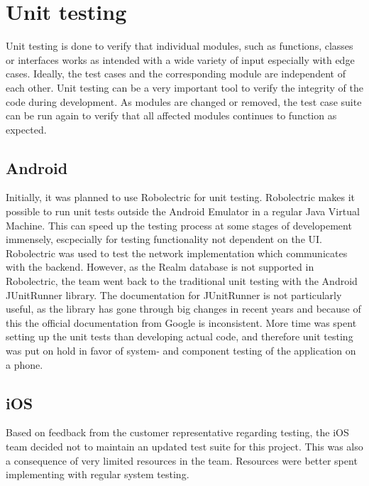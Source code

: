 \section{Unit testing}
Unit testing is done to verify that individual modules, such as functions, classes or interfaces works as intended with a wide variety of input \textendash  especially with edge cases. \cite[p. 211-216]{progark} Ideally, the test cases and the corresponding module are independent of each other. Unit testing can be a very important tool to verify the integrity of the code during development. As modules are changed or removed, the test case suite can be run again to verify that all affected modules continues to function as expected.
\subsection{Android}
Initially, it was planned to use Robolectric for unit testing. Robolectric makes it possible to run unit tests outside the Android Emulator in a regular Java Virtual Machine. \cite{robolectric} This can speed up the testing process at some stages of developement immensely, escpecially for testing functionality not dependent on the UI. Robolectric was used to test the network implementation which communicates with the \gls{backend}. However, as the Realm database is not supported in Robolectric, the team went back to the traditional unit testing with the Android JUnitRunner library. The documentation for JUnitRunner is not particularly useful, as the library has gone through big changes in recent years and because of this the official documentation from Google is inconsistent. More time was spent setting up the unit tests than developing actual code, and therefore unit testing was put on hold in favor of system- and component testing of the application on a phone.

\subsection{iOS}
Based on feedback from the customer representative regarding testing, the iOS team decided not to maintain an updated test suite for this project. This was also a consequence of very limited resources in the team. Resources were better spent implementing with regular system testing.

